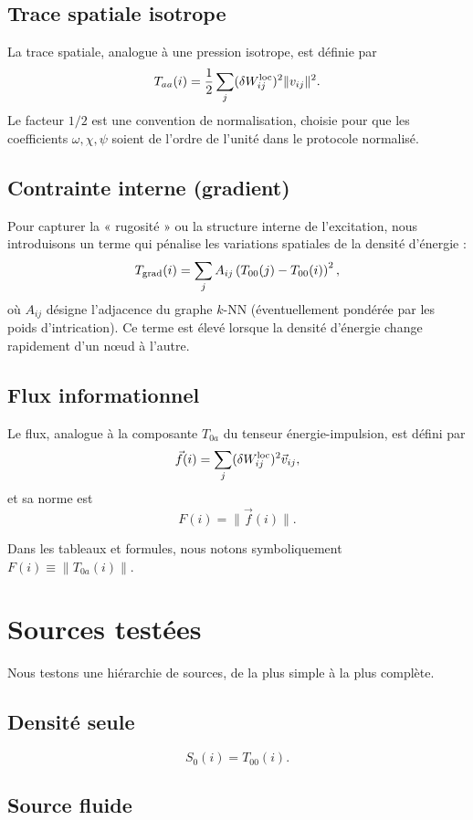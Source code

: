 \documentclass[11pt,a4paper]{article}
\begin{document}
\subsection{Trace spatiale isotrope}

La trace spatiale, analogue à une pression isotrope, est définie par
\[
T_{aa}(i)
=
\frac12
\sum_j
(\delta W_{ij}^{\rm loc})^2
\|v_{ij}\|^2.
\]
Le facteur \(1/2\) est une convention de normalisation, choisie pour que
les coefficients \(\omega, \chi, \psi\) soient de l'ordre de l'unité dans
le protocole normalisé.

\subsection{Contrainte interne (gradient)}

Pour capturer la « rugosité » ou la structure interne de l'excitation,
nous introduisons un terme qui pénalise les variations spatiales de la
densité d'énergie :
\[
T_{\rm grad}(i)
=
\sum_j
A_{ij}
\left(
T_{00}(j) - T_{00}(i)
\right)^2,
\]
où \(A_{ij}\) désigne l'adjacence du graphe \(k\)-NN (éventuellement pondérée
par les poids d'intrication). Ce terme est élevé lorsque la densité d'énergie
change rapidement d'un nœud à l'autre.

\subsection{Flux informationnel}

Le flux, analogue à la composante \(T_{0a}\) du tenseur énergie-impulsion,
est défini par
\[
\vec f(i)
=
\sum_j
(\delta W_{ij}^{\rm loc})^2
\vec v_{ij},
\]
et sa norme est
\[
F(i) = \|\vec f(i)\|.
\]

Dans les tableaux et formules, nous notons symboliquement
\(F(i) \equiv \|T_{0a}(i)\|\).

\section{Sources testées}

Nous testons une hiérarchie de sources, de la plus simple à la plus complète.

\subsection{Densité seule}

\[
S_0(i) = T_{00}(i).
\]

\subsection{Source fluide}
\end{document}
